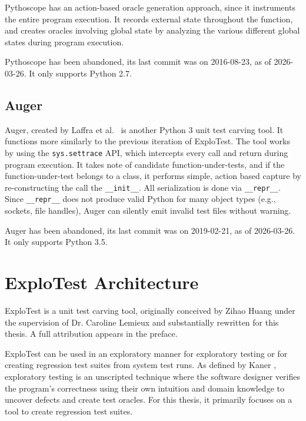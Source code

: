 Pythoscope has an action-based oracle generation approach, since it instruments the entire program execution. It records external state
throughout the function, and creates oracles involving global state by analyzing the various different global states during
program execution.

Pythoscope has been abandoned, its last commit was on 2016-08-23, as of 2026-03-26. It only supports Python 2.7.

\subsection{Auger}
Auger, created by Laffra et al.\ \cite{augerblogspot} is another Python 3 unit test carving tool. It functions more similarly to
the previous iteration of ExploTest. The tool works by using the \verb|sys.settrace| API, which intercepts every call and return during
program execution. It takes note of candidate function-under-tests, and if the function-under-test belongs to a class, it performs
simple, action based capture by re-constructing the call the \verb|__init__|. All serialization is done via \verb|__repr__|.
Since \verb|__repr__| does not produce valid Python for many object types (e.g., sockets, file handles), Auger can silently emit
invalid test files without warning.

Auger has been abandoned, its last commit was on 2019-02-21, as of 2026-03-26. It only supports Python 3.5.


\section{ExploTest Architecture}

ExploTest is a unit test carving tool, originally conceived by Zihao Huang under the supervision of Dr. Caroline Lemieux and substantially rewritten for this thesis. A full attribution appears in the preface.


ExploTest can be used in an exploratory manner for exploratory testing or for creating regression test suites
from system test runs.
As defined by Kaner \cite{kaner2008tutorial}, exploratory testing is an unscripted technique where the software designer verifies the program's
correctness using their own intuition and domain knowledge to uncover defects and create test oracles. For this thesis, it primarily
focuses on a tool to create regression test suites.

